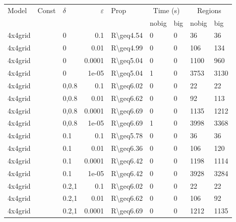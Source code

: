 \begin{longtable}{lllrlllll}

\toprule
 Model & Const & $\delta$ & $\varepsilon$ & Prop & \multicolumn{2}{c}{Time (s)} & \multicolumn{2}{c}{Regions} \\
\cmidrule(ll){6-7} \cmidrule(ll){8-9}
 & & & & & nobig & big & nobig & big \\
\midrule

 4x4grid       &           & 0     & 0.1    & R\textbackslash{}geq4.54  & 0    & 0    & 36       & 36      \\
 4x4grid       &           & 0     & 0.01   & R\textbackslash{}geq4.99  & 0    & 0    & 106      & 134     \\
 4x4grid       &           & 0     & 0.0001 & R\textbackslash{}geq5.04  & 0    & 0    & 1100     & 960     \\
 4x4grid       &           & 0     & 1e-05  & R\textbackslash{}geq5.04  & 1    & 0    & 3753     & 3130    \\
 4x4grid       &           & 0,0.8 & 0.1    & R\textbackslash{}geq6.02  & 0    & 0    & 22       & 22      \\
 4x4grid       &           & 0,0.8 & 0.01   & R\textbackslash{}geq6.62  & 0    & 0    & 92       & 113     \\
 4x4grid       &           & 0,0.8 & 0.0001 & R\textbackslash{}geq6.69  & 0    & 0    & 1135     & 1212    \\
 4x4grid       &           & 0,0.8 & 1e-05  & R\textbackslash{}geq6.69  & 1    & 0    & 3998     & 3368    \\
 4x4grid       &           & 0.1   & 0.1    & R\textbackslash{}geq5.78  & 0    & 0    & 36       & 36      \\
 4x4grid       &           & 0.1   & 0.01   & R\textbackslash{}geq6.36  & 0    & 0    & 106      & 120     \\
 4x4grid       &           & 0.1   & 0.0001 & R\textbackslash{}geq6.42  & 0    & 0    & 1198     & 1114    \\
 4x4grid       &           & 0.1   & 1e-05  & R\textbackslash{}geq6.42  & 0    & 0    & 3928     & 3284    \\
 4x4grid       &           & 0.2,1 & 0.1    & R\textbackslash{}geq6.02  & 0    & 0    & 22       & 22      \\
 4x4grid       &           & 0.2,1 & 0.01   & R\textbackslash{}geq6.62  & 0    & 0    & 106      & 92      \\
 4x4grid       &           & 0.2,1 & 0.0001 & R\textbackslash{}geq6.69  & 0    & 0    & 1212     & 1135    \\

\end{longtable}
